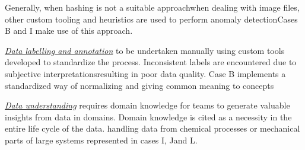 Generally, when hashing is not a suitable approach\DIFdelbegin {}\DIFdelend \DIFaddbegin {}\DIFaddend when dealing with image files, other custom tooling and heuristics are used to perform anomaly detection\DIFdelbegin \DIFdel{, }\DIFdelend \DIFaddbegin \DIFadd{; }\DIFaddend Cases B and I make use of this approach.

\DIFdelbegin %

\DIFdelend \underline{\emph{Data labelling and annotation}} \DIFdelbegin {}\DIFdelend \DIFaddbegin {}\DIFaddend to be undertaken manually using custom tools developed to standardize the process. %
Inconsistent labels are \DIFdelbegin {}\DIFdelend \DIFaddbegin {}\DIFaddend encountered due to subjective interpretations\DIFdelbegin {}\DIFdelend \DIFaddbegin \DIFadd{, }\DIFaddend resulting in poor data quality. \DIFdelbegin {}\DIFdelend Case B implements a standardized way of normalizing and giving common meaning to concepts \DIFdelbegin {}\DIFdelend \DIFaddbegin {}\DIFaddend 

\underline{\emph{Data understanding}} requires domain knowledge for teams to generate valuable insights from data in \DIFdelbegin {}\DIFdelend \DIFaddbegin {}\DIFaddend domains. Domain knowledge is cited as a necessity in the entire life cycle of the data. \DIFdelbegin {}\DIFdelend \DIFaddbegin {}\DIFaddend handling data from chemical processes or mechanical parts of large systems \DIFaddbegin {}\DIFaddend represented in cases I, J\DIFaddbegin \DIFadd{, }\DIFaddend and L.

